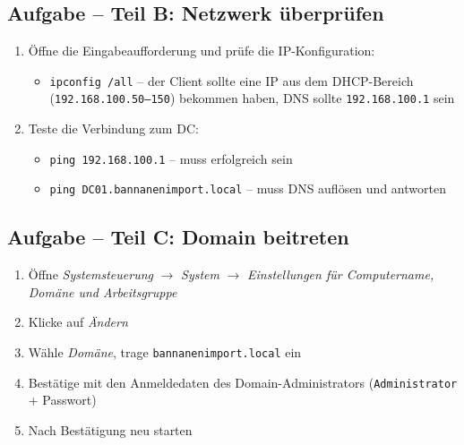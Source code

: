\documentclass[11pt, oneside, numbers=noenddot]{scrbook}
\begin{document}
\subsection*{Aufgabe -- Teil B: Netzwerk überprüfen}
\begin{enumerate}
  \item Öffne die Eingabeaufforderung und prüfe die IP-Konfiguration:
  \begin{itemize}
    \item \texttt{ipconfig /all} -- der Client sollte eine IP aus dem DHCP-Bereich\\ (\texttt{192.168.100.50--150}) bekommen haben, DNS sollte \texttt{192.168.100.1} sein
  \end{itemize}
  \item Teste die Verbindung zum DC:
  \begin{itemize}
    \item \texttt{ping 192.168.100.1} -- muss erfolgreich sein
    \item \texttt{ping DC01.bannanenimport.local} -- muss DNS auflösen und antworten
  \end{itemize}
\end{enumerate}

\subsection*{Aufgabe -- Teil C: Domain beitreten}
\begin{enumerate}
  \item Öffne \textit{Systemsteuerung} $\rightarrow$ \textit{System} $\rightarrow$ \textit{Einstellungen für Computername, Domäne und Arbeitsgruppe}
  \item Klicke auf \textit{Ändern}
  \item Wähle \textit{Domäne}, trage \texttt{bannanenimport.local} ein
  \item Bestätige mit den Anmeldedaten des Domain-Administrators (\texttt{Administrator} + Passwort)
  \item Nach Bestätigung neu starten
\end{enumerate}
\end{document}
